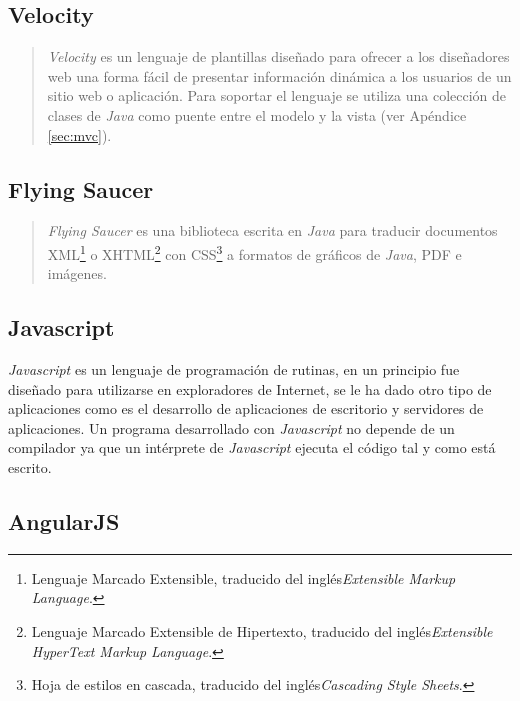 \subsection{Velocity}\label{sec:velocity}
\begin{quote}
	\textit{Velocity} es un lenguaje de plantillas diseñado para ofrecer a los diseñadores web una forma fácil de presentar información dinámica a los usuarios de un sitio web o aplicación. Para soportar el lenguaje se utiliza una colección de clases de \textit{Java} como puente entre el modelo y la vista\cite{MasteringApacheVelocity} (ver Apéndice \ref{sec:mvc}).
\end{quote}

\subsection{Flying Saucer}\label{sec:flying-saucer}
\begin{quote}
	\textit{Flying Saucer} es una biblioteca escrita en \textit{Java} para traducir documentos XML\footnote{Lenguaje Marcado Extensible, traducido del inglés\textit{Extensible Markup Language}.} o XHTML\footnote{Lenguaje Marcado Extensible de Hipertexto, traducido del inglés\textit{Extensible HyperText Markup Language}.} con CSS\footnote{Hoja de estilos en cascada, traducido del inglés\textit{Cascading Style Sheets}.} a formatos de gráficos de \textit{Java}, PDF e imágenes\cite{FlyingSaucer}.
\end{quote}

\subsection{Javascript}\label{sec:javascript}
\textit{Javascript} es un lenguaje de programación de rutinas, en un principio fue diseñado para utilizarse en exploradores de Internet, se le ha dado otro tipo de aplicaciones como es el desarrollo de aplicaciones de escritorio y servidores de aplicaciones. Un programa desarrollado con \textit{Javascript} no depende de un compilador ya que un intérprete de \textit{Javascript} ejecuta el código tal y como está escrito\cite{LearningWebDesign}.

\subsection{AngularJS}\label{sec:angularjs}

